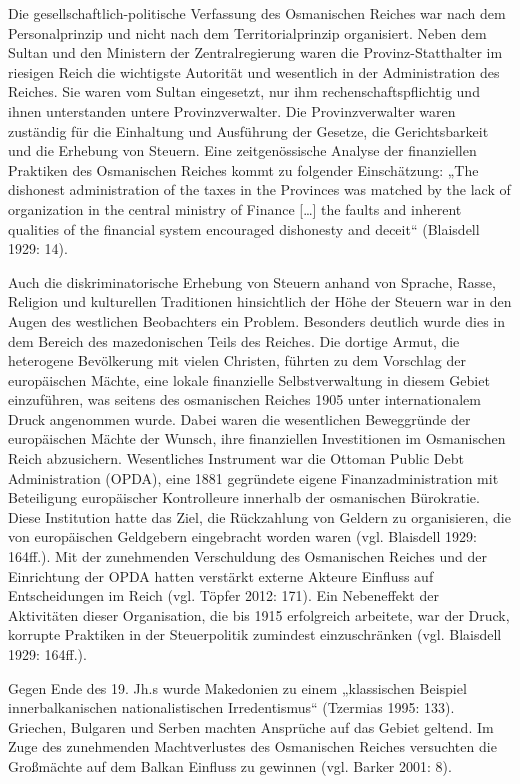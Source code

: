 Die gesellschaftlich-politische Verfassung des Osmanischen Reiches war nach dem Personalprinzip und nicht nach dem Territorialprinzip organisiert. Neben dem Sultan und den Ministern der Zentralregierung waren die Provinz-Statthalter im riesigen Reich die wichtigste Autorität und wesentlich in der Administration des Reiches. Sie waren vom Sultan eingesetzt, nur ihm rechenschaftspflichtig und ihnen unterstanden untere Provinzverwalter. Die Provinzverwalter waren zuständig für die Einhaltung und Ausführung der Gesetze, die Gerichtsbarkeit und die Erhebung von Steuern. Eine zeitgenössische Analyse der finanziellen Praktiken des Osmanischen Reiches kommt zu folgender Einschätzung: „The dishonest administration of the taxes in the Provinces was matched by the lack of organization in the central ministry of Finance […] the faults and inherent qualities of the financial system encouraged dishonesty and deceit“ (Blaisdell 1929: 14).\par
Auch die diskriminatorische Erhebung von Steuern anhand von Sprache, Rasse, Religion und kulturellen Traditionen hinsichtlich der Höhe der Steuern war in den Augen des westlichen Beobachters ein Problem. Besonders deutlich wurde dies in dem Bereich des mazedonischen Teils des Reiches. Die dortige Armut, die heterogene Bevölkerung mit vielen Christen, führten zu dem Vorschlag der europäischen Mächte, eine lokale finanzielle Selbstverwaltung in diesem Gebiet einzuführen, was seitens des osmanischen Reiches 1905 unter internationalem Druck angenommen wurde. Dabei waren die wesentlichen Beweggründe der europäischen Mächte der Wunsch, ihre finanziellen Investitionen im Osmanischen Reich abzusichern. Wesentliches Instrument war die Ottoman Public Debt Administration (OPDA), eine 1881 gegründete eigene Finanzadministration mit Beteiligung europäischer Kontrolleure innerhalb der osmanischen Bürokratie. Diese Institution hatte das Ziel, die Rückzahlung von Geldern zu organisieren, die von europäischen Geldgebern eingebracht worden waren (vgl. Blaisdell 1929: 164ff.). Mit der zunehmenden Verschuldung des Osmanischen Reiches und der Einrichtung der OPDA hatten verstärkt externe Akteure Einfluss auf Entscheidungen im Reich (vgl. Töpfer 2012: 171). Ein Nebeneffekt der Aktivitäten dieser Organisation, die bis 1915 erfolgreich arbeitete, war der Druck, korrupte Praktiken in der Steuerpolitik zumindest einzuschränken (vgl. Blaisdell 1929: 164ff.).\par
Gegen Ende des 19. Jh.s wurde Makedonien zu einem „klassischen Beispiel innerbalkanischen nationalistischen Irredentismus“ (Tzermias 1995: 133). Griechen, Bulgaren und Serben machten Ansprüche auf das Gebiet geltend. Im Zuge des zunehmenden Machtverlustes des Osmanischen Reiches versuchten die Großmächte auf dem Balkan Einfluss zu gewinnen (vgl. Barker 2001: 8).
